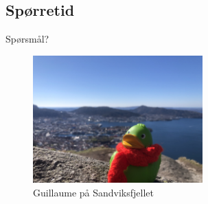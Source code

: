 \subsection*{Spørretid}
\begin{frame}{Spørsmål?}
    \begin{figure}
        \centering
        \includegraphics[height = 4.9cm]{images/guillaume1.jpg}
        \caption{Guillaume på Sandviksfjellet}
        \label{fig:guillaume1}
    \end{figure}
\end{frame}